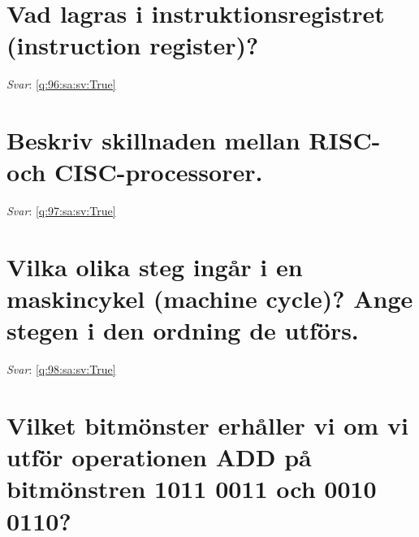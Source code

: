 \documentclass[a4paper,11pt,oneside]{book}
\begin{document}
\begin{sloppypar}
\section{Vad lagras i instruktionsregistret (instruction register)?}

\label{q:96:sa:sv:False}

\vspace{2cm}

\noindent\makebox[\textwidth]{\hrulefill}

\vspace{1cm}

\textit{Svar}: \autoref{q:96:sa:sv:True}



\section{Beskriv skillnaden mellan RISC- och CISC-processorer.}

\label{q:97:sa:sv:False}

\vspace{2cm}

\noindent\makebox[\textwidth]{\hrulefill}

\vspace{1cm}

\textit{Svar}: \autoref{q:97:sa:sv:True}



\section{Vilka olika steg ing\r{a}r i en maskincykel (machine cycle)? Ange stegen i den ordning de utf\"ors.}

\label{q:98:sa:sv:False}

\vspace{2cm}

\noindent\makebox[\textwidth]{\hrulefill}

\vspace{1cm}

\textit{Svar}: \autoref{q:98:sa:sv:True}



\section{Vilket bitm\"onster erh\r{a}ller vi om vi utf\"or operationen ADD p\r{a} bitm\"onstren 1011 0011 och 0010 0110?}

\label{q:99:sa:sv:False}


\end{sloppypar}
\end{document}
